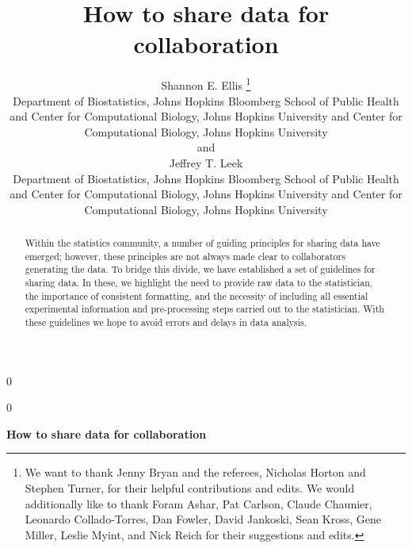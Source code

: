 \documentclass[12pt]{article}
\newcommand{\blind}{0}
\begin{document}
\def\spacingset#1{\renewcommand{\baselinestretch}%
{#1}\small\normalsize} \spacingset{1}



\blind
{
  \title{\bf How to share data for collaboration}

  \author{
        Shannon E. Ellis \thanks{We want to thank Jenny Bryan and the referees, Nicholas Horton and
Stephen Turner, for their helpful contributions and edits. We would
additionally like to thank Foram Ashar, Pat Carlson, Claude Chaunier,
Leonardo Collado-Torres, Dan Fowler, David Jankoski, Sean Kross, Gene
Miller, Leslie Myint, and Nick Reich for their suggestions and edits.} \\
    Department of Biostatistics, Johns Hopkins Bloomberg School of Public
    Health and Center for Computational Biology, Johns Hopkins University
    and Center for Computational Biology, Johns Hopkins University\\
     and \\     Jeffrey T. Leek \\
    Department of Biostatistics, Johns Hopkins Bloomberg School of Public
    Health and Center for Computational Biology, Johns Hopkins University
    and Center for Computational Biology, Johns Hopkins University\\
      }
  \maketitle
} \fi

\blind
{
  \bigskip
  \bigskip
  \bigskip
  \begin{center}
    {\LARGE\bf How to share data for collaboration}
  \end{center}
  \medskip
} \fi

\bigskip
\begin{abstract}
Within the statistics community, a number of guiding principles for
sharing data have emerged; however, these principles are not always made
clear to collaborators generating the data. To bridge this divide, we
have established a set of guidelines for sharing data. In these, we
highlight the need to provide raw data to the statistician, the
importance of consistent formatting, and the necessity of including all
essential experimental information and pre-processing steps carried out
to the statistician. With these guidelines we hope to avoid errors and
delays in data analysis.
\end{abstract}
\end{document}
